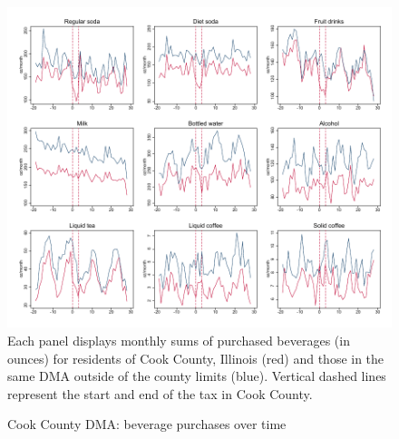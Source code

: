 \documentclass[12pt]{article}
\begin{document}
\clearpage
\begin{figure}[t]
\begin{center}
\caption{Cook County DMA: beverage purchases over time}
\label{cook_panelist_bev}
\includegraphics[width=1\textwidth, angle=0]{../figures/panelist_bev.pdf}
\footnotesize Each panel displays monthly sums of purchased beverages (in ounces) for residents of Cook County, Illinois (red) and those in the same DMA outside of the county limits (blue). Vertical dashed lines represent the start and end of the tax in Cook County.
\end{center}
\end{figure}
\end{document}
